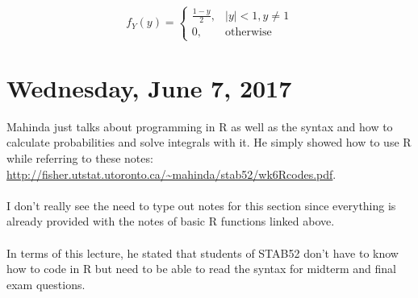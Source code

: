 \documentclass[12pt]{article}
\begin{document}
$$f_Y (y) = \begin{cases}
	\frac{1-y}{2}, & |y| < 1, y \neq 1\\
	0, & \text{otherwise}
\end{cases}
$$

\newpage

\section{Wednesday, June 7, 2017}

Mahinda just talks about programming in R as well as the syntax and how to calculate probabilities and solve integrals with it. He simply showed how to use R while referring to these notes:\\
\url{http://fisher.utstat.utoronto.ca/~mahinda/stab52/wk6Rcodes.pdf}.\\
\\
I don't really see the need to type out notes for this section since everything is already provided with the notes of basic R functions linked above.\\
\\
In terms of this lecture, he stated that students of STAB52 don't have to know how to code in R but need to be able to read the syntax for midterm and final exam questions.

\newpage
\end{document}
